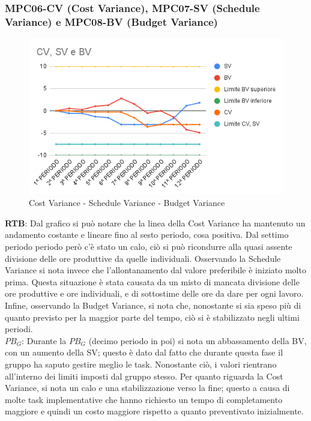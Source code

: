 \subsubsection{MPC06-CV (Cost Variance), MPC07-SV (Schedule Variance) e MPC08-BV (Budget Variance)}
\begin{figure}[H]
  \centering
  \includegraphics[width=0.7\linewidth]{grafici/CV, SV e BV.png}
  \caption{Cost Variance - Schedule Variance - Budget Variance}
\end{figure}
\textbf{RTB}: Dal grafico si può notare che la linea della Cost Variance ha mantenuto un andamento costante e lineare fino al sesto periodo, cosa positiva. Dal settimo periodo periodo però c'è stato un calo, ciò si può ricondurre alla quasi assente divisione delle ore produttive da quelle individuali. Osservando la Schedule Variance si nota invece che l'allontanamento dal valore preferibile è iniziato molto prima. Questa situazione è stata causata da un misto di mancata divisione delle ore produttive e ore individuali, e di sottostime delle ore da dare per ogni lavoro. Infine, osservando la Budget Variance, si nota che, nonostante si sia speso più di quanto previsto per la maggior parte del tempo, ciò si è stabilizzato negli ultimi periodi.
\\\textbf{$\textit{PB}_G$}: Durante la $\textit{PB}_G$ (decimo periodo in poi) si nota un abbassamento della BV, con un aumento della SV; questo è dato dal fatto che durante questa fase il gruppo ha saputo gestire meglio le task. Nonostante ciò, i valori rientrano all'interno dei limiti imposti dal gruppo stesso. Per quanto riguarda la Cost Variance, si nota un calo e una stabilizzazione verso la fine; questo a causa di molte task implementative che hanno richiesto un tempo di completamento maggiore e quindi un costo maggiore rispetto a quanto preventivato inizialmente.
